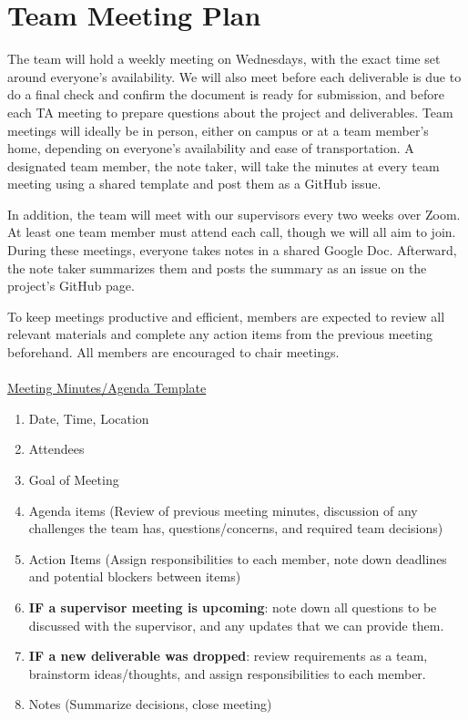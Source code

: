 \documentclass{article}
\begin{document}
\section{Team Meeting Plan}
The team will hold a weekly meeting on Wednesdays, with the exact time set around everyone's availability. 
We will also meet before each deliverable is due to do a final check and confirm the document is ready for submission, and before each TA meeting to prepare questions about the project and deliverables. 
Team meetings will ideally be in person, either on campus or at a team member's home, depending on everyone's availability and ease of transportation. 
A designated team member, the note taker, will take the minutes at every team meeting using a shared template and post them as a GitHub issue.

In addition, the team will meet with our supervisors every two weeks over Zoom. 
At least one team member must attend each call, though we will all aim to join. 
During these meetings, everyone takes notes in a shared Google Doc. 
Afterward, the note taker summarizes them and posts the summary as an issue on the project's GitHub page.

To keep meetings productive and efficient, members are expected to review all relevant materials and complete any action items from the previous meeting beforehand. 
All members are encouraged to chair meetings.
\\
\\
\underline{Meeting Minutes/Agenda Template}

\begin{enumerate}
    \item Date, Time, Location
    \item Attendees
    \item Goal of Meeting
    \item Agenda items (Review of previous meeting minutes, discussion of any challenges the team has, questions/concerns, and required team decisions)
    \item Action Items (Assign responsibilities to each member, note down deadlines and potential blockers between items)
    \item \textbf{IF a supervisor meeting is upcoming}: note down all questions to be discussed with the supervisor, and any updates that we can provide them.
    \item \textbf{IF a new deliverable was dropped}: review requirements as a team, brainstorm ideas/thoughts, and assign responsibilities to each member.
    \item Notes (Summarize decisions, close meeting)
\end{enumerate}
\end{document}

